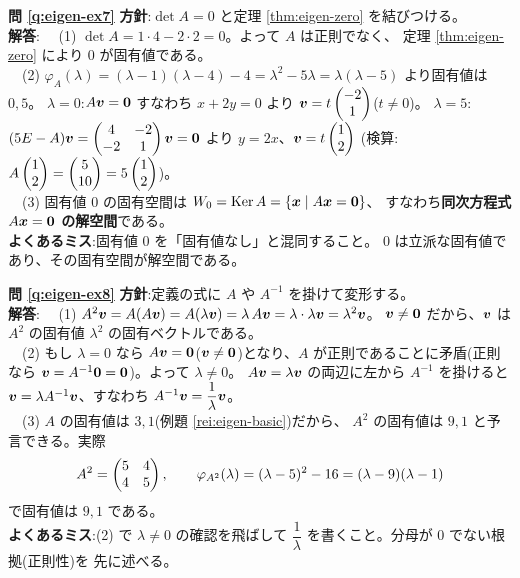 \bigskip
\noindent\textbf{問 \ref{q:eigen-ex7}}\quad
\textbf{方針}:$\det A = 0$ と定理 \ref{thm:eigen-zero} を結びつける。\\
\textbf{解答}:
　(1) $\det A = 1 \cdot 4 - 2 \cdot 2 = 0$。よって $A$ は正則でなく、
定理 \ref{thm:eigen-zero} により $0$ が固有値である。\\
　(2) $\varphi_A(\lambda) = (\lambda - 1)(\lambda - 4) - 4
= \lambda^2 - 5\lambda = \lambda(\lambda - 5)$ より固有値は $0, 5$。
$\lambda = 0$:$A\bm{v} = \bm{0}$ すなわち $x + 2y = 0$ より
$\bm{v} = t\begin{pmatrix}-2 \\ 1\end{pmatrix}$($t \neq 0$)。
$\lambda = 5$:$(5E - A)\bm{v} = \begin{pmatrix}4 & -2 \\ -2 & 1\end{pmatrix}\bm{v} = \bm{0}$
より $y = 2x$、$\bm{v} = t\begin{pmatrix}1 \\ 2\end{pmatrix}$
(検算:$A\begin{pmatrix}1 \\ 2\end{pmatrix} = \begin{pmatrix}5 \\ 10\end{pmatrix} = 5\begin{pmatrix}1 \\ 2\end{pmatrix}$)。\\
　(3) 固有値 $0$ の固有空間は
$W_0 = \mathrm{Ker}\,A = \{\bm{x} \mid A\bm{x} = \bm{0}\}$、
すなわち\textbf{同次方程式 $A\bm{x} = \bm{0}$ の解空間}である。\\
\textbf{よくあるミス}:固有値 $0$ を「固有値なし」と混同すること。
$0$ は立派な固有値であり、その固有空間が解空間である。

\bigskip
\noindent\textbf{問 \ref{q:eigen-ex8}}\quad
\textbf{方針}:定義の式に $A$ や $A^{-1}$ を掛けて変形する。\\
\textbf{解答}:
　(1) $A^2\bm{v} = A(A\bm{v}) = A(\lambda\bm{v})
= \lambda\,A\bm{v} = \lambda \cdot \lambda\bm{v} = \lambda^2\bm{v}$。
$\bm{v} \neq \bm{0}$ だから、$\bm{v}$ は $A^2$ の固有値
$\lambda^2$ の固有ベクトルである。\\
　(2) もし $\lambda = 0$ なら $A\bm{v} = \bm{0}$($\bm{v} \neq
\bm{0}$)となり、$A$ が正則であることに矛盾(正則なら
$\bm{v} = A^{-1}\bm{0} = \bm{0}$)。よって $\lambda \neq 0$。
$A\bm{v} = \lambda\bm{v}$ の両辺に左から $A^{-1}$ を掛けると
$\bm{v} = \lambda A^{-1}\bm{v}$、すなわち
$A^{-1}\bm{v} = \dfrac{1}{\lambda}\bm{v}$。\\
　(3) $A$ の固有値は $3, 1$(例題 \ref{rei:eigen-basic})だから、
$A^2$ の固有値は $9, 1$ と予言できる。実際
\[
A^2 = \begin{pmatrix}5 & 4 \\ 4 & 5\end{pmatrix}, \qquad
\varphi_{A^2}(\lambda) = (\lambda - 5)^2 - 16 = (\lambda - 9)(\lambda - 1)
\]
で固有値は $9, 1$ である。\\
\textbf{よくあるミス}:(2) で $\lambda \neq 0$ の確認を飛ばして
$\dfrac{1}{\lambda}$ を書くこと。分母が $0$ でない根拠(正則性)を
先に述べる。

